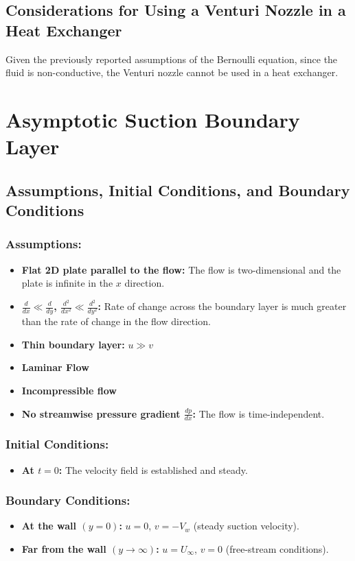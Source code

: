 \documentclass{article}
\begin{document}
\subsection{Considerations for Using a Venturi Nozzle in a Heat Exchanger}

Given the previously reported assumptions of the Bernoulli equation, since the fluid is non-conductive, the Venturi nozzle cannot be used in a heat exchanger.

\section{Asymptotic Suction Boundary Layer}

\subsection{Assumptions, Initial Conditions, and Boundary Conditions}

\subsubsection{Assumptions:}
\begin{itemize}
    \item \textbf{Flat 2D plate parallel to the flow:} The flow is two-dimensional and the plate is infinite in the \(x\) direction.
    \item \textbf{\(\frac{d}{dx} \ll \frac{d}{dy}\), \(\frac{d^2}{dx^2} \ll \frac{d^2}{dy^2}\):} Rate of change across the boundary layer is much greater than the rate of change in the flow direction.
    \item \textbf{Thin boundary layer:} \(u \gg v\)
    \item \textbf{Laminar Flow}
    \item \textbf{Incompressible flow}
    \item \textbf{No streamwise pressure gradient \(\frac{dp}{dx}\):} The flow is time-independent.
\end{itemize}

\subsubsection{Initial Conditions:}
\begin{itemize}
    \item \textbf{At \(t = 0\):} The velocity field is established and steady.
\end{itemize}

\subsubsection{Boundary Conditions:}
\begin{itemize}
    \item \textbf{At the wall \((y = 0)\):} \(u = 0\), \(v = -V_w\) (steady suction velocity).
    \item \textbf{Far from the wall \((y \rightarrow \infty)\):} \(u = U_\infty\), \(v = 0\) (free-stream conditions).
\end{itemize}
\end{document}
